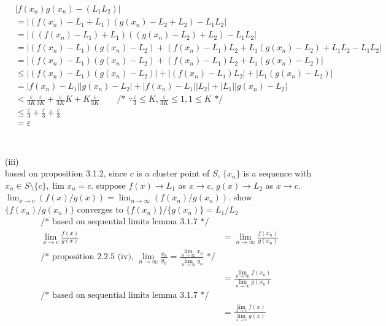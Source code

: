 \documentclass[12pt, border = 4pt, multi]{article} %
\begin{document}
\begin{align*}
&|f(x_n)g(x_n) - (L_1 L_2)|\\
&= |(f(x_n) - L_1 + L_1)(g(x_n) - L_2 + L_2) - L_1 L_2|\\
&= |((f(x_n) - L_1) + L_1)((g(x_n) - L_2) + L_2) - L_1 L_2|\\
&= |(f(x_n) - L_1)(g(x_n) - L_2) + (f(x_n) - L_1) L_2 + L_1 (g(x_n) - L_2) + L_1 L_2 - L_1 L_2|\\
&= |(f(x_n) - L_1)(g(x_n) - L_2) + (f(x_n) - L_1) L_2 + L_1 (g(x_n) - L_2)|\\
&\leq |(f(x_n) - L_1)(g(x_n) - L_2)| + |(f(x_n) - L_1) L_2| + |L_1 (g(x_n) - L_2)|\\
&= |f(x_n) - L_1||g(x_n) - L_2| + |f(x_n) - L_1||L_2| + |L_1||g(x_n) - L_2|\\
&< \frac{\varepsilon}{3K}\frac{\varepsilon}{3K} + \frac{\varepsilon}{3K}K + K\frac{\varepsilon}{3K} \qquad \text{/* } \because \frac{\varepsilon}{3} \leq K, \frac{\varepsilon}{3K} \leq 1, 1 \leq K \text{ */}\\
&\leq \frac{\varepsilon}{3} + \frac{\varepsilon}{3} + \frac{\varepsilon}{3}\\
&= \varepsilon\\
\end{align*}
\\
\\
(iii)\\
based on proposition 3.1.2, since $c$ is a cluster point of $S$, $\{x_n\}$ is a sequence with $x_n \in S \setminus \{c\}, \lim x_n = c$. suppose $f(x) \rightarrow L_1$ as $x \rightarrow c$, $g(x) \rightarrow L_2$ as $x \rightarrow c$. $\lim_{x \rightarrow c} (f(x) / g(x)) = \lim_{n \rightarrow \infty} (f(x_n) / g(x_n))$. show $\{f(x_n) / g(x_n)\}$ converges to $\{f(x_n)\} / \{g(x_n)\} = L_1 / L_2$
\begin{align*}
\text{/* based on sequential limits lemma 3.1.7 */}\\
\lim_{x \rightarrow c} \frac{f(x)}{g(x)} &= \lim_{n \rightarrow \infty} \frac{f(x_n)}{g(x_n)}\\
\text{/* proposition 2.2.5 (iv), } \lim_{n \rightarrow \infty} \frac{x_n}{y_n} = \frac{\lim_{n \rightarrow \infty} x_n}{\lim_{n \rightarrow \infty} y_n} \text{ */}\\
&= \frac{\lim_{n \rightarrow \infty} f(x_n)}{\lim_{n \rightarrow \infty} g(x_n)}\\
\text{/* based on sequential limits lemma 3.1.7 */}\\
&= \frac{\lim_{x \rightarrow c} f(x)}{\lim_{x \rightarrow c} g(x)}\\
\end{align*}
\end{document}
